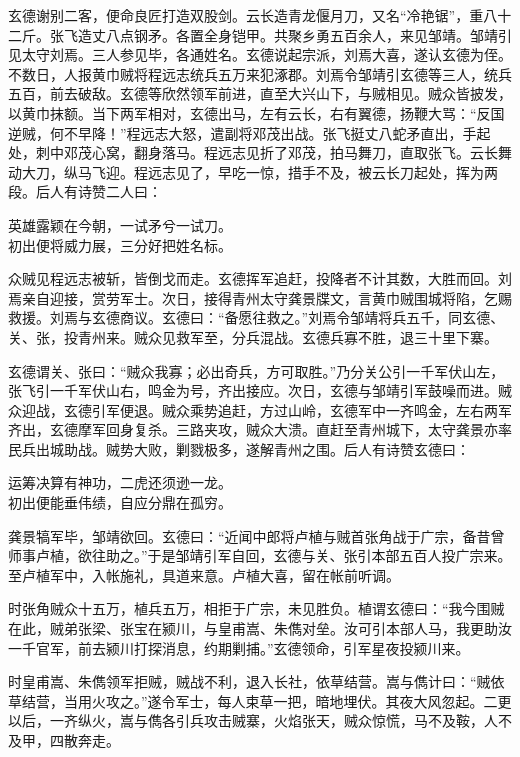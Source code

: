 \documentclass[a4paper]{article}
\begin{document}
玄德谢别二客，便命良匠打造双股剑。云长造青龙偃月刀，又名“冷艳锯”，重八十二斤。张飞造丈八点钢矛。各置全身铠甲。共聚乡勇五百余人，来见邹靖。邹靖引见太守刘焉。三人参见毕，各通姓名。玄德说起宗派，刘焉大喜，遂认玄德为侄。不数日，人报黄巾贼将程远志统兵五万来犯涿郡。刘焉令邹靖引玄德等三人，统兵五百，前去破敌。玄德等欣然领军前进，直至大兴山下，与贼相见。贼众皆披发，以黄巾抹额。当下两军相对，玄德出马，左有云长，右有翼德，扬鞭大骂：“反国逆贼，何不早降！”程远志大怒，遣副将邓茂出战。张飞挺丈八蛇矛直出，手起处，刺中邓茂心窝，翻身落马。程远志见折了邓茂，拍马舞刀，直取张飞。云长舞动大刀，纵马飞迎。程远志见了，早吃一惊，措手不及，被云长刀起处，挥为两段。后人有诗赞二人曰：
\begin{center}
    \kaishu
    英雄露颖在今朝，一试矛兮一试刀。\\
    初出便将威力展，三分好把姓名标。
\end{center}

众贼见程远志被斩，皆倒戈而走。玄德挥军追赶，投降者不计其数，大胜而回。刘焉亲自迎接，赏劳军士。次日，接得青州太守龚景牒文，言黄巾贼围城将陷，乞赐救援。刘焉与玄德商议。玄德曰：“备愿往救之。”刘焉令邹靖将兵五千，同玄德、关、张，投青州来。贼众见救军至，分兵混战。玄德兵寡不胜，退三十里下寨。

玄德谓关、张曰：“贼众我寡；必出奇兵，方可取胜。”乃分关公引一千军伏山左，张飞引一千军伏山右，鸣金为号，齐出接应。次日，玄德与邹靖引军鼓噪而进。贼众迎战，玄德引军便退。贼众乘势追赶，方过山岭，玄德军中一齐鸣金，左右两军齐出，玄德摩军回身复杀。三路夹攻，贼众大溃。直赶至青州城下，太守龚景亦率民兵出城助战。贼势大败，剿戮极多，遂解青州之围。后人有诗赞玄德曰：
\begin{center}
    \kaishu
    运筹决算有神功，二虎还须逊一龙。\\
    初出便能垂伟绩，自应分鼎在孤穷。
\end{center}

龚景犒军毕，邹靖欲回。玄德曰：“近闻中郎将卢植与贼首张角战于广宗，备昔曾师事卢植，欲往助之。”于是邹靖引军自回，玄德与关、张引本部五百人投广宗来。至卢植军中，入帐施礼，具道来意。卢植大喜，留在帐前听调。

时张角贼众十五万，植兵五万，相拒于广宗，未见胜负。植谓玄德曰：“我今围贼在此，贼弟张梁、张宝在颍川，与皇甫嵩、朱儁对垒。汝可引本部人马，我更助汝一千官军，前去颍川打探消息，约期剿捕。”玄德领命，引军星夜投颍川来。

时皇甫嵩、朱儁领军拒贼，贼战不利，退入长社，依草结营。嵩与儁计曰：“贼依草结营，当用火攻之。”遂令军士，每人束草一把，暗地埋伏。其夜大风忽起。二更以后，一齐纵火，嵩与儁各引兵攻击贼寨，火焰张天，贼众惊慌，马不及鞍，人不及甲，四散奔走。
\end{document}

